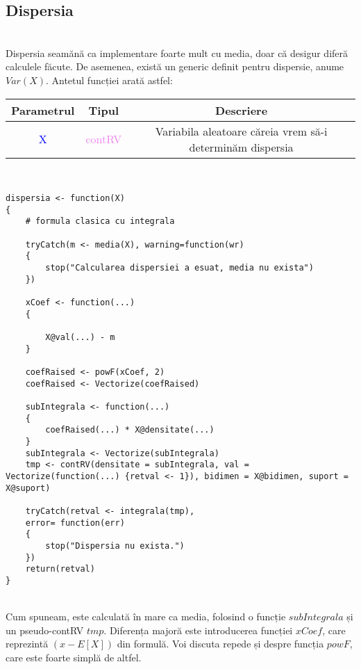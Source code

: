 \documentclass[12pt]{article}
\begin{document}
\subsection{Dispersia} \hfill \\
\indent Dispersia seamănă ca implementare foarte mult cu media, doar că desigur diferă calculele făcute. De asemenea, există un generic definit pentru dispersie, anume $Var(X)$. Antetul funcției arată astfel:
\begin{center}
	\begin{tabular}{|| c | c | c ||}
		\hline
		Parametrul & Tipul & Descriere \\
		\hline
		\textcolor{blue}{X} & \textcolor{violet}{contRV} & Variabila aleatoare căreia vrem să-i determinăm dispersia\\
		\hline
	\end{tabular}
\end{center}\hfill \\
\begin{lstlisting}
dispersia <- function(X)
{
	# formula clasica cu integrala
	
	tryCatch(m <- media(X), warning=function(wr)
	{
		stop("Calcularea dispersiei a esuat, media nu exista")
	})
	
	xCoef <- function(...)
	{
		
		X@val(...) - m
	}
	
	coefRaised <- powF(xCoef, 2)
	coefRaised <- Vectorize(coefRaised)
	
	subIntegrala <- function(...)
	{
		coefRaised(...) * X@densitate(...)
	}
	subIntegrala <- Vectorize(subIntegrala)
	tmp <- contRV(densitate = subIntegrala, val = Vectorize(function(...) {retval <- 1}), bidimen = X@bidimen, suport = X@suport)
	
	tryCatch(retval <- integrala(tmp),
	error= function(err)
	{
		stop("Dispersia nu exista.")
	})
	return(retval)
}
\end{lstlisting}\hfill \\
\indent Cum spuneam, este calculată în mare ca media, folosind o funcție $subIntegrala$ și un pseudo-contRV $tmp$. Diferența majoră este introducerea funcției $xCoef$, care reprezintă $(x - E[X])$ din formulă. Voi discuta repede și despre funcția $powF$, care este foarte simplă de altfel. \\
\end{document}
